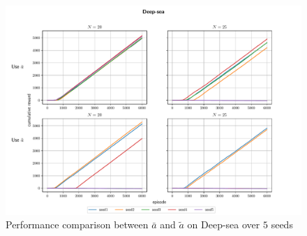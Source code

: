 \documentclass[letterpaper]{article} %
\theoremstyle{definition}
\begin{document}
\begin{figure}[ht]
    \centering
        \includegraphics[width=\linewidth]{action_comparison.pdf}
        \caption{Performance comparison between $\bar{a}$ and $\tilde{a}$ on Deep-sea over $5$ seeds}  
		\label{fig:compare_action}
\end{figure}

\setcounter{assumption}{0}
\setcounter{theorem}{0}
\setcounter{lemma}{0}
\end{document}
